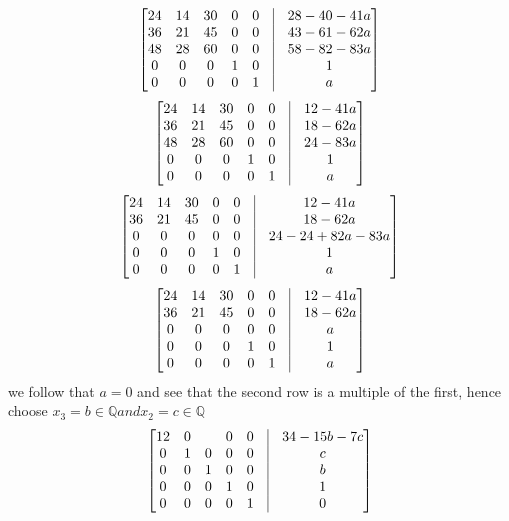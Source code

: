 \documentclass[a4paper,10pt]{article}
\begin{document}
\[
\begin{bmatrix}
 24 & 14 & 30 & 0  & 0 & \vline & 28-40-41a\\
 36 & 21 & 45 & 0  & 0 & \vline & 43-61-62a\\
 48 & 28 & 60 & 0  & 0 & \vline & 58-82-83a\\
 0 & 0   & 0  & 1  & 0 & \vline & 1\\
 0 &  0  & 0  & 0  & 1 & \vline & a\\
\end{bmatrix}
\]
\[
\begin{bmatrix}
 24 & 14 & 30 & 0  & 0 & \vline & 12-41a\\
 36 & 21 & 45 & 0  & 0 & \vline & 18-62a\\
 48 & 28 & 60 & 0  & 0 & \vline & 24-83a\\
 0 & 0   & 0  & 1  & 0 & \vline & 1\\
 0 &  0  & 0  & 0  & 1 & \vline & a\\
\end{bmatrix}
\]
\[
\begin{bmatrix}
 24 & 14 & 30 & 0  & 0 & \vline & 12-41a\\
 36 & 21 & 45 & 0  & 0 & \vline & 18-62a\\
 0  & 0  & 0  & 0  & 0 & \vline & 24-24+82a-83a\\
 0 & 0   & 0  & 1  & 0 & \vline & 1\\
 0 &  0  & 0  & 0  & 1 & \vline & a\\
\end{bmatrix}
\] 
\[
\begin{bmatrix}
 24 & 14 & 30 & 0  & 0 & \vline & 12-41a\\
 36 & 21 & 45 & 0  & 0 & \vline & 18-62a\\
 0  & 0  & 0  & 0  & 0 & \vline & a\\
 0 & 0   & 0  & 1  & 0 & \vline & 1 \\
 0 &  0  & 0  & 0  & 1 & \vline & a \\
\end{bmatrix}
\]
we follow that $a=0$ and see that the second row is a multiple of the first, hence choose $x_3=b \in \mathbb{Q} and x_2=c \in \mathbb{Q}$
\[
\begin{bmatrix}
 12 & 0 &  & 0  & 0 & \vline & 34 -15b -7c\\
 0  & 1  & 0  & 0  & 0 & \vline & c\\
 0  & 0  & 1  & 0  & 0 & \vline & b \\
 0 & 0   & 0  & 1  & 0 & \vline & 1 \\
 0 &  0  & 0  & 0  & 1 & \vline & 0 \\
\end{bmatrix}
\]
\end{document}
